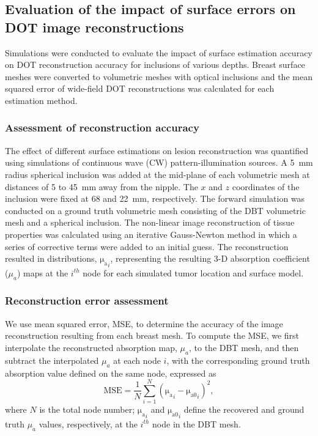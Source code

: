 \subsection{Evaluation of the impact of surface errors on DOT image reconstructions}
Simulations were conducted to evaluate the impact of surface estimation accuracy on DOT reconstruction accuracy for inclusions of various depths. Breast surface meshes were converted to volumetric meshes with optical inclusions and the mean squared error of wide-field DOT reconstructions was calculated for each estimation method. 

\subsubsection{Assessment of reconstruction accuracy}
The effect of different surface estimations on lesion reconstruction was quantified using simulations of continuous wave (CW) pattern-illumination sources. A 5~mm radius spherical inclusion was added at the mid-plane of each volumetric mesh at distances of 5 to 45~mm away from the nipple. The $x$ and $z$ coordinates of the inclusion were fixed at 68 and 22~mm, respectively. The forward simulation was conducted on a ground truth volumetric mesh consisting of the DBT volumetric mesh and a spherical inclusion. The non-linear image reconstruction of tissue properties was calculated using an iterative Gauss-Newton method in which a series of corrective terms were added to an initial guess. The reconstruction resulted in distributions, $\mathrm{\mu_{a}}_{i}$, representing the resulting 3-D absorption coefficient ($\mu_a$) maps at the $i^{th}$ node for each simulated tumor location and surface model.

\subsubsection{Reconstruction error assessment}
We use mean squared error, MSE, to determine the accuracy of the image reconstruction resulting from each breast mesh. To compute the MSE, we first interpolate the reconstructed absorption map, $\mu_a$, to the DBT mesh, and then subtract the interpolated $\mu_a$ at each node $i$, with the corresponding ground truth absorption value defined on the same node, expressed as
\begin{equation}
\label{eq:mse}
\mathrm{MSE} = \frac{1}{N}\sum_{i=1}^{N}(\mathrm{\mu_{a}}_{i} - \mathrm{\mu_{a0}}_i)^{2},
\end{equation}
where $N$ is the total node number; $\mathrm{\mu_{a}}_i$ and $\mathrm{\mu_{a0}}_i$ define the recovered and ground truth $\mu_{a}$ values, respectively, at the $i^{th}$ node in the DBT mesh.



